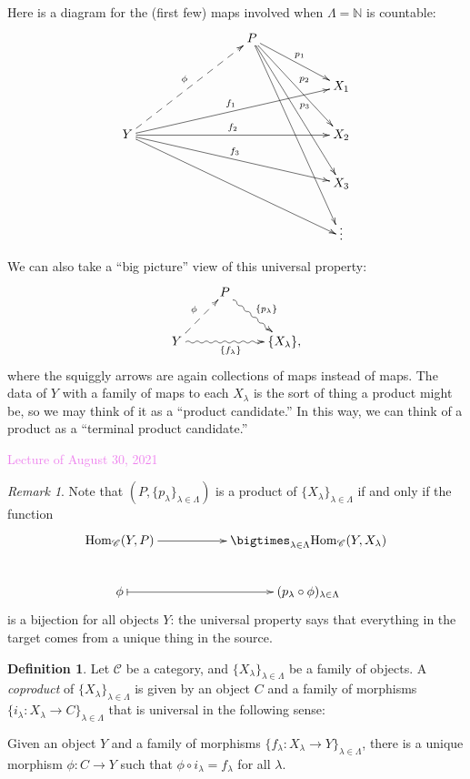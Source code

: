 \documentclass{amsart}[12pt]
\newcommand{\Hom}{\mathrm{Hom}}
\def\sC{\mathscr C}
\newcommand{\Aug}[1]{\textcolor{violet}{Lecture of August #1, 2021}}
\newcommand{\N}{\mathbb{N}}
\newcommand{\DEF}[1]{\emph{#1}\index{#1}}
\numberwithin{equation}{section}
\theoremstyle{plain} %
\theoremstyle{definition}
\newtheorem{defn}[equation]{Definition}
\theoremstyle{remark}
\newtheorem{rem}[equation]{Remark}
\begin{document}
Here is a diagram for the (first few) maps involved when $\Lambda=\N$ is countable:
\[\xymatrix{  & & & P \ar[drr]^-{p_1} \ar[ddrr]^-{p_2} \ar[dddrr]^-{p_3} \ar[ddddrr]  & & \\
 & & & & & X_1\\
Y \ar@{-->}[uurrr]^-{\phi}\ar[urrrrr]^-{f_1}  \ar[rrrrr]^-{f_2} \ar[drrrrr]^-{f_3} \ar[ddrrrrr]&  & & & & X_2\\
& & & & & X_3\\
& & & & & \vdots }\]

We can also take a ``big picture'' view of this universal property:
\[\xymatrix{ & P\ar@{~>}[dr]^{\{p_\lambda\}} & \\
Y \ar@{-->}[ur]^{\phi} \ar@{~>}[rr]_{\{f_\lambda\}} & & \{X_{\lambda}\},}\]
where the squiggly arrows are again collections of maps instead of maps. The data of $Y$ with a family of maps to each $X_\lambda$ is the sort of thing a product might be, so we may think of it as a ``product candidate.'' In this way, we can think of a product as a ``terminal product candidate.''



\Aug{30}



\begin{rem}
Note that $(P,\{p_\lambda\}_{\lambda\in\Lambda})$ is a product of $\{ X_\lambda\}_{\lambda\in \Lambda}$ if and only if the function
\[ \xymatrix{ \Hom_{\sC}(Y,P) \ar[rr] & & \bigtimes_{\lambda\in\Lambda} \Hom_{\sC}(Y,X_\lambda)\\
\phi \ar@{|->}[rr] & &  ( p_\lambda \circ \phi )_{\lambda\in \Lambda}}\]
is a bijection for all objects $Y$: the universal property says that everything in the target comes from a unique thing in the source.
\end{rem}




\begin{defn} Let $\sC$ be a category, and $\{ X_\lambda\}_{\lambda\in \Lambda}$ be a family of objects. A \DEF{coproduct} of $\{ X_\lambda\}_{\lambda\in \Lambda}$ is given by an object $C$ and a family of morphisms $\{i_\lambda : X_\lambda \to C\}_{\lambda\in \Lambda}$ that is universal in the following sense:

Given an object $Y$ and a family of morphisms $\{f_\lambda:X_\lambda \to Y\}_{\lambda\in \Lambda}$, there is a unique morphism $\phi: C\to Y$ such that $\phi \circ i_\lambda = f_\lambda$ for all $\lambda$.
\end{defn}
\end{document}
